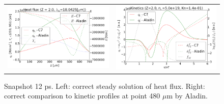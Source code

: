 \begin{figure}[tbh]
  \begin{center}
    \begin{tabular}{cc}
      \includegraphics[width=\figscale\textwidth]{../VFPdata/C7_Aladin_case2_heatflux.png} &
      \includegraphics[width=\figscale\textwidth]{../VFPdata/C7_Aladin_case2_kinetics.png}
    \end{tabular}
  \caption{  
  Snapshot 12 ps. Left: correct steady solution of heat flux. Right: correct comparison to kinetic profiles at point 480 $\mu$m  by Aladin.
  }
  \end{center}
  \label{fig:C7_Aladin_case2}
\end{figure}

